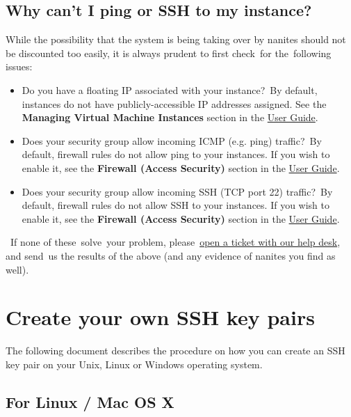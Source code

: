 \subsection{Why can't I ping or SSH to my
instance?}\label{why-cant-i-ping-or-ssh-to-my-instance}

While the possibility that the system is being taking over by nanites
should not be discounted too easily, it is always prudent to first
check~for the~following issues:

\begin{itemize}
\item
  Do you have a floating IP associated with your instance?~By default,
  instances do not have publicly-accessible IP addresses assigned. See
  the \textbf{Managing Virtual Machine Instances} section in the
  \href{https://www.chameleoncloud.org/docs/user-guides/openstack-kvm-user-guide/}{User
  Guide}.
\item
  Does your security group allow incoming ICMP (e.g. ping) traffic?~By
  default, firewall rules do not allow ping to your instances. If you
  wish to enable it, see the \textbf{Firewall (Access Security)} section
  in the
  \href{https://www.chameleoncloud.org/docs/user-guides/openstack-kvm-user-guide/}{User
  Guide}.
\item
  Does your security group allow incoming SSH (TCP port 22) traffic?~By
  default, firewall rules do not allow SSH to your instances. If you
  wish to enable it, see the \textbf{Firewall (Access Security)} section
  in the
  \href{https://www.chameleoncloud.org/docs/user-guides/openstack-kvm-user-guide/}{User
  Guide}.
\end{itemize}

~If none of these~solve~your problem,
please~\href{https://www.chameleoncloud.org/user/help/}{open a ticket
with our help desk}, and send~us the results of the above (and any
evidence of nanites you find as well).

\section{Create your own SSH key pairs}\label{create-your-own-ssh-key-pairs}

The following document describes the procedure on how you can create an
SSH key pair on your Unix, Linux or Windows operating system.

\subsection{For Linux / Mac OS X}\label{for-linux-mac-os-x}

